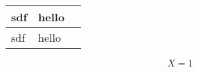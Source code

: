 \setcounter{num}{0}
\begin{tabularx}{\linewidth}{|X|X|X|}
	sdf & hello & \thenum \\\hline
	sdf & hello & \stepcounter{num}\thenum \\
\end{tabularx}

\[ X = 1 \]
